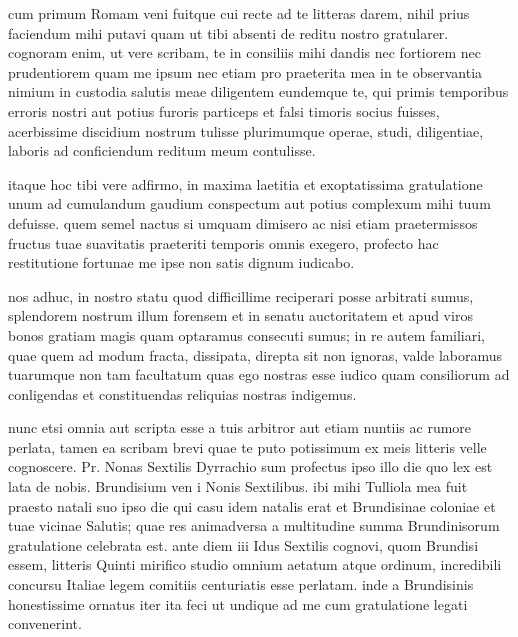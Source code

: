 


 cum primum Romam veni fuitque cui recte ad te litteras darem, nihil prius faciendum mihi putavi quam ut tibi absenti de reditu nostro gratularer. cognoram enim, ut vere scribam, te in consiliis mihi dandis nec fortiorem nec prudentiorem quam me ipsum nec etiam pro praeterita mea in te observantia nimium in custodia salutis meae diligentem eundemque te, qui primis temporibus erroris nostri aut potius furoris particeps et falsi timoris socius fuisses, acerbissime discidium nostrum tulisse plurimumque operae, studi, diligentiae, laboris ad conficiendum reditum meum contulisse.

 itaque hoc tibi vere adfirmo, in maxima laetitia et exoptatissima gratulatione unum ad cumulandum gaudium conspectum aut potius complexum mihi tuum defuisse. quem semel nactus si umquam dimisero ac nisi etiam praetermissos fructus tuae suavitatis praeteriti temporis omnis exegero, profecto hac restitutione fortunae me ipse non satis dignum iudicabo.

 nos adhuc, in nostro statu quod difficillime reciperari posse arbitrati sumus, splendorem nostrum illum forensem et in senatu auctoritatem et apud viros bonos gratiam magis quam optaramus consecuti sumus; in re autem familiari, quae quem ad modum fracta, dissipata, direpta sit non ignoras, valde laboramus tuarumque non tam facultatum quas ego nostras esse iudico quam consiliorum ad conligendas et constituendas reliquias nostras indigemus.

 nunc etsi omnia aut scripta esse a tuis arbitror aut etiam nuntiis ac rumore perlata, tamen ea scribam brevi quae te puto potissimum ex meis litteris velle cognoscere. Pr. Nonas Sextilis Dyrrachio sum profectus ipso illo die quo lex est lata de nobis. Brundisium ven i Nonis Sextilibus. ibi mihi Tulliola mea fuit praesto natali suo ipso die qui casu idem natalis erat et Brundisinae coloniae et tuae vicinae Salutis; quae res animadversa a multitudine summa Brundinisorum gratulatione celebrata est. ante diem iii Idus Sextilis cognovi, quom Brundisi essem, litteris Quinti mirifico studio omnium aetatum atque ordinum, incredibili concursu Italiae legem comitiis centuriatis esse perlatam. inde a Brundisinis honestissime ornatus iter ita feci ut undique ad me cum gratulatione legati convenerint.

